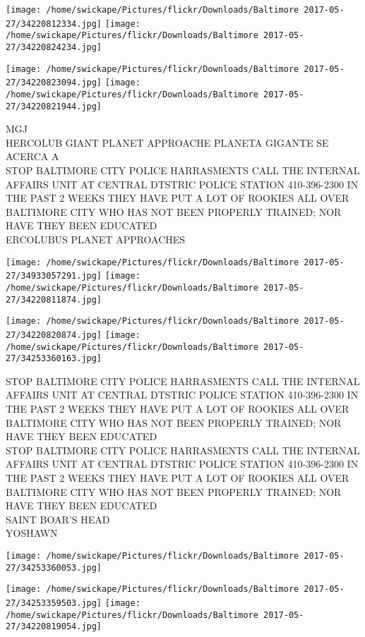 \documentclass[10pt,letterpaper]{article}
\begin{document}
\texttt{[image: /home/swickape/Pictures/flickr/Downloads/Baltimore 2017-05-27/34220812334.jpg]}
\texttt{[image: /home/swickape/Pictures/flickr/Downloads/Baltimore 2017-05-27/34220824234.jpg]}

\texttt{[image: /home/swickape/Pictures/flickr/Downloads/Baltimore 2017-05-27/34220823094.jpg]}
\texttt{[image: /home/swickape/Pictures/flickr/Downloads/Baltimore 2017-05-27/34220821944.jpg]}

MGJ\\
HERCOLUB GIANT PLANET APPROACHE PLANETA GIGANTE SE ACERCA A\\
STOP BALTIMORE CITY POLICE HARRASMENTS CALL THE INTERNAL AFFAIRS UNIT AT CENTRAL DTSTRIC POLICE STATION 410{-}396{-}2300 IN THE PAST 2 WEEKS THEY HAVE PUT A LOT OF ROOKIES ALL OVER BALTIMORE CITY WHO HAS NOT BEEN PROPERLY TRAINED; NOR HAVE THEY BEEN EDUCATED\\
ERCOLUBUS PLANET APPROACHES
\pagebreak

\texttt{[image: /home/swickape/Pictures/flickr/Downloads/Baltimore 2017-05-27/34933057291.jpg]}
\texttt{[image: /home/swickape/Pictures/flickr/Downloads/Baltimore 2017-05-27/34220811874.jpg]}

\texttt{[image: /home/swickape/Pictures/flickr/Downloads/Baltimore 2017-05-27/34220820874.jpg]}
\texttt{[image: /home/swickape/Pictures/flickr/Downloads/Baltimore 2017-05-27/34253360163.jpg]}

STOP BALTIMORE CITY POLICE HARRASMENTS CALL THE INTERNAL AFFAIRS UNIT AT CENTRAL DTSTRIC POLICE STATION 410{-}396{-}2300 IN THE PAST 2 WEEKS THEY HAVE PUT A LOT OF ROOKIES ALL OVER BALTIMORE CITY WHO HAS NOT BEEN PROPERLY TRAINED; NOR HAVE THEY BEEN EDUCATED\\
STOP BALTIMORE CITY POLICE HARRASMENTS CALL THE INTERNAL AFFAIRS UNIT AT CENTRAL DTSTRIC POLICE STATION 410{-}396{-}2300 IN THE PAST 2 WEEKS THEY HAVE PUT A LOT OF ROOKIES ALL OVER BALTIMORE CITY WHO HAS NOT BEEN PROPERLY TRAINED; NOR HAVE THEY BEEN EDUCATED\\
SAINT BOAR'S HEAD\\
YOSHAWN
\pagebreak

\texttt{[image: /home/swickape/Pictures/flickr/Downloads/Baltimore 2017-05-27/34253360053.jpg]}

\vspace{0.25in}
\texttt{[image: /home/swickape/Pictures/flickr/Downloads/Baltimore 2017-05-27/34253359503.jpg]}
\texttt{[image: /home/swickape/Pictures/flickr/Downloads/Baltimore 2017-05-27/34220819054.jpg]}
\end{document}
